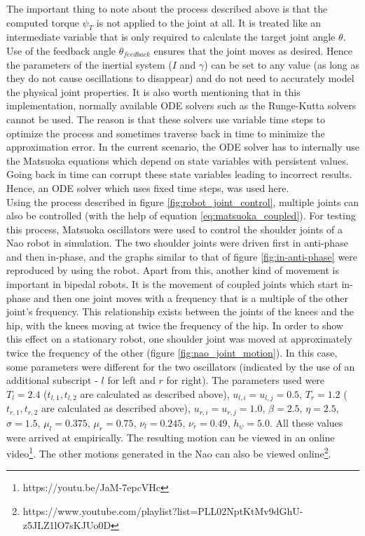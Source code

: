 \documentclass[12pt,twoside]{article}
\theoremstyle{plain}
\theoremstyle{definition}
\theoremstyle{remark}
\newcommand{\forceindent}{\leavevmode{\parindent=2em\indent}}
\begin{document}
\forceindent The important thing to note about the process described above is that the computed torque $\psi_T$ is not applied to the joint at all. It is treated like an intermediate variable that is only required to calculate the target joint angle $\theta$. Use of the feedback angle $\theta_{feedback}$ ensures that the joint moves as desired. Hence the parameters of the inertial system ($I$ and $\gamma$) can be set to any value (as long as they do not cause oscillations to disappear) and do not need to accurately model the physical joint properties. It is also worth mentioning that in this implementation, normally available ODE solvers such as the Runge-Kutta solvers cannot be used. The reason is that these solvers use variable time steps to optimize the process and sometimes traverse back in time to minimize the approximation error. In the current scenario, the ODE solver has to internally use the Matsuoka equations which depend on state variables with persistent values. Going back in time can corrupt these state variables leading to incorrect results. Hence, an ODE solver which uses fixed time steps, was used here.\\
\forceindent Using the process described in figure \ref{fig:robot_joint_control}, multiple joints can also be controlled (with the help of equation \ref{eq:matsuoka_coupled}). For testing this process, Matsuoka oscillators were used to control the shoulder joints of a Nao robot in simulation. The two shoulder joints were driven first in anti-phase and then in-phase, and the graphs similar to that of figure \ref{fig:in-anti-phase} were reproduced by using the robot. Apart from this, another kind of movement is important in bipedal robots. It is the movement of coupled joints which start in-phase and then one joint moves with a frequency that is a multiple of the other joint's frequency. This relationship exists between the joints of the knees and the hip, with the knees moving at twice the frequency of the hip. In order to show this effect on a stationary robot, one shoulder joint was moved at approximately twice the frequency of the other (figure \ref{fig:nao_joint_motion}). In this case, some parameters were  different for the two oscillators (indicated by the use of an additional subscript - $l$ for left and $r$ for right). The parameters used were $T_l=2.4$ ($t_{l,1},t_{l,2}$ are calculated as described above), $u_{l,i}=u_{l,j}=0.5$, $T_r=1.2$ ($t_{r,1},t_{r,2}$ are calculated as described above), $u_{r,i}=u_{r,j}=1.0$, $\beta=2.5$, $\eta=2.5$, $\sigma=1.5$, $\mu_l=0.375$, $\mu_r=0.75$, $\nu_l=0.245$, $\nu_r=0.49$, $h_\psi=5.0$. All these values were arrived at empirically. The resulting motion can be viewed in an online video\footnote{https://youtu.be/JaM-7epcVHc}. The other motions generated in the Nao can also be viewed online\footnote{https://www.youtube.com/playlist?list=PLL02NptKtMv9dGhU-z5JLZ1lO7sKJUo0D}.
\end{document}
